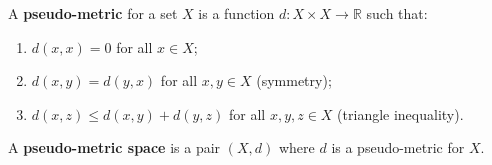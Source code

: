 A \textbf{pseudo-metric} for a set $X$ is a function $d : X \times X \to \mathbb{R}$ such that:
\begin{enumerate}
\item[(a)] $d(x,x) = 0$ for all $x \in X$;
\item[(b)] $d(x,y) = d(y,x)$ for all $x, y \in X$ (symmetry);
\item[(c)] $d(x,z) \leq d(x,y) + d(y,z)$ for all $x, y, z \in X$ (triangle inequality).
\end{enumerate}
A \textbf{pseudo-metric space} is a pair $(X,d)$ where $d$ is a pseudo-metric for $X$.
